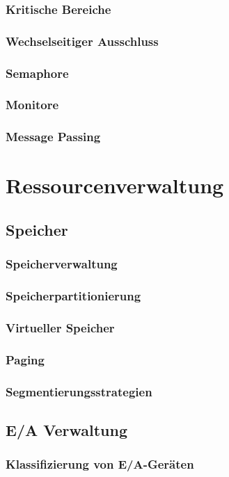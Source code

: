 \documentclass{article}
\begin{document}
\subsubsection{Kritische Bereiche}
\subsubsection{Wechselseitiger Ausschluss}
\subsubsection{Semaphore}
\subsubsection{Monitore}
\subsubsection{Message Passing}

\newpage
\section{Ressourcenverwaltung}
\subsection{Speicher}
\subsubsection{Speicherverwaltung}
\subsubsection{Speicherpartitionierung}
\subsubsection{Virtueller Speicher}
\subsubsection{Paging}
\subsubsection{Segmentierungsstrategien}
\subsection{E/A Verwaltung}
\subsubsection{Klassifizierung von E/A-Geräten}
\end{document}
